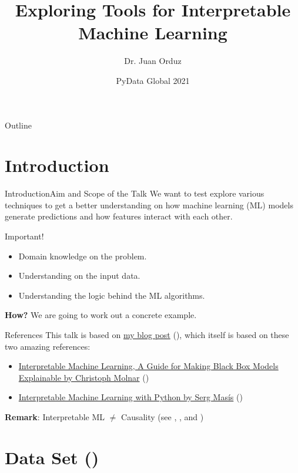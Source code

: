\documentclass[10pt]{beamer}
\title[Exploring Tools for Interpretable Machine Learning] %
{Exploring Tools for Interpretable Machine Learning}
\author[Dr. Juan Orduz] %
{Dr. Juan Orduz}
\institute[PyData Global 2021] %
{}
\date[PyData Global 2021] %
{PyData Global 2021}
\begin{document}
\begin{frame}
  \titlepage
\end{frame}

\begin{frame}{Outline}
\tableofcontents
\end{frame}

\section{Introduction}

\begin{frame}{Introduction}{Aim and Scope of the Talk}
We want to test explore various techniques to get a better understanding on how machine learning (ML) models generate predictions and how features interact with each other.

\begin{block}{Important!}
\begin{itemize}
\item Domain knowledge on the problem. 
\item Understanding on the input data.
\item Understanding the logic behind the ML algorithms.
\end{itemize}
\end{block}
\pause
{\bf How?} We are going to work out a concrete example.
\begin{block}{References}
This talk is based on \href{https://juanitorduz.github.io/interpretable_ml/}{my blog post} (\cite{interpretable_ml_orduz_2021}), which itself is based on these two amazing references:
\begin{itemize}
\item \href{https://christophm.github.io/interpretable-ml-book/}{Interpretable Machine Learning, A Guide for Making Black Box Models Explainable by Christoph Molnar} (\cite{molnar2019})
\item \href{https://github.com/PacktPublishing/Interpretable-Machine-Learning-with-Python}{Interpretable Machine Learning with Python by Serg Mas\'is} (\cite{masis2021})
\end{itemize}
\end{block}
{\bf Remark}: Interpretable ML $\neq$ Causality (see \cite{10.2307/j.ctv1c29t27}, \cite{tdd_sl}, \cite{statrethinkingbook} and \cite{molnar2020interpretable})
\end{frame}

\section{Data Set (\cite{molnar2019})}
\end{document}
